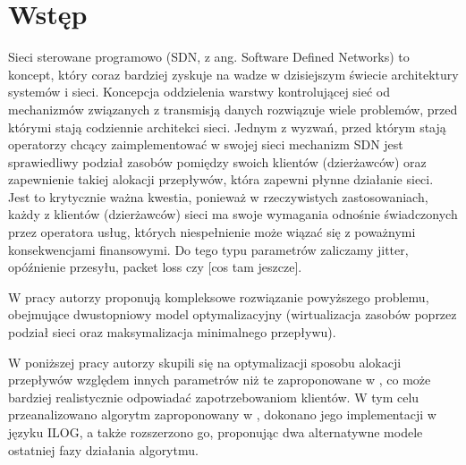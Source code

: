 \section{Wstęp}

Sieci sterowane programowo (SDN, z ang. Software Defined Networks) to koncept, który coraz bardziej zyskuje na wadze w dzisiejszym świecie architektury systemów i sieci. Koncepcja oddzielenia warstwy kontrolującej sieć od mechanizmów związanych z transmisją danych rozwiązuje wiele problemów, przed którymi stają codziennie architekci sieci. Jednym z wyzwań, przed którym stają operatorzy chcący zaimplementować w swojej sieci mechanizm SDN jest sprawiedliwy podział zasobów pomiędzy swoich klientów (dzierżawców) oraz zapewnienie takiej alokacji przepływów, która zapewni płynne działanie sieci. Jest to krytycznie ważna kwestia, ponieważ w rzeczywistych zastosowaniach, każdy z klientów (dzierżawców) sieci ma swoje wymagania odnośnie świadczonych przez operatora usług, których niespełnienie może wiązać się z poważnymi konsekwencjami finansowymi. Do tego typu parametrów zaliczamy jitter, opóźnienie przesyłu, packet loss czy [cos tam jeszcze]. \newline

\noindent W pracy \cite{lin16} autorzy proponują kompleksowe rozwiązanie powyższego problemu, obejmujące dwustopniowy model optymalizacyjny (wirtualizacja zasobów poprzez podział sieci oraz maksymalizacja minimalnego przepływu).  \newline

\noindent W poniższej pracy autorzy skupili się na optymalizacji sposobu alokacji przepływów względem innych parametrów niż te zaproponowane w \cite{lin16}, co może bardziej realistycznie odpowiadać zapotrzebowaniom klientów. W tym celu przeanalizowano algorytm zaproponowany w \cite{lin16}, dokonano jego implementacji w języku ILOG, a także rozszerzono go, proponując dwa alternatywne modele ostatniej fazy działania algorytmu.
